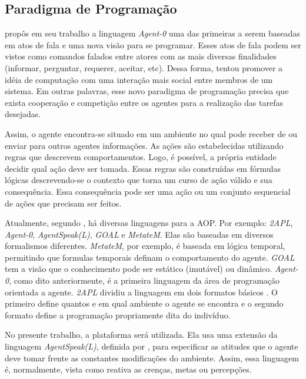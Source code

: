 \subsection{Paradigma de Programação} \label{sec:aoppp}

\citet{shoham1993agent} propôs em seu trabalho a linguagem \emph{Agent-0} uma
das primeiras a serem baseadas em atos de fala e uma nova visão para se
programar.  Esses atos de fala podem ser vistos como comandos falados entre
atores com as mais diversas finalidades (informar, perguntar, requerer,
aceitar, etc).  Dessa forma,  tentou promover a
idéia de computação com uma interação mais social entre membros de um sistema.
Em outras palavras, esse novo paradigma de programação precisa que exista
cooperação e competição entre os agentes para a realização das tarefas
desejadas.

Assim, o agente encontra-se situado em um ambiente no qual pode receber de ou
enviar para outros agentes informações. As ações são
estabelecidas utilizando regras que descrevem comportamentos. Logo, é
possível, a própria entidade decidir qual ação deve ser tomada. Essas regras
são construídas em fórmulas lógicas descrevendo-se o contexto que torna um
curso de ação válido e sua consequência. Essa consequência pode ser uma ação
ou um conjunto sequencial de ações que precisam ser feitos.

Atualmente, segundo \citet{bordini2009multi}, há diversas linguagens para a
AOP. Por exemplo: \emph{2APL}, \emph{Agent-0}, \emph{AgentSpeak(L)},
\emph{GOAL} e \emph{MetateM}. Elas são baseadas em diversos
formalismos diferentes. \emph{MetateM}, por exemplo, é baseada em lógica temporal,
permitindo que formulas temporais definam o comportamento do agente.
\emph{GOAL} tem a visão que o conhecimento pode ser estático (imutável) ou
dinâmico. \emph{Agent-0}, como dito anteriormente, é a primeira linguagem da
área de programação orientada a agente. \emph{2APL} dividiu a linguagem em
dois formatos básicos \cite{dastani20082apl}. O primeiro define quantos e em
qual ambiente o agente se encontra e o segundo formato define a programação
propriamente dita do indivíduo.

No presente trabalho, a plataforma \jason \cite{bordini-jason} será utilizada.
Ela usa uma extensão da linguagem \emph{AgentSpeak(L)}, definida por
\citet{rao1996agentspeak}, para especificar as atitudes que o agente deve
tomar frente as constantes modificações do ambiente. Assim, essa linguagem é,
normalmente, vista como reativa as crenças, metas ou percepções.

